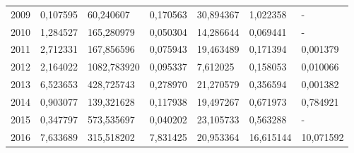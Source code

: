 \begin{table}
\begin{tabular}{p{1cm}p{2cm}p{2cm}p{2cm}p{2cm}p{2cm}p{2cm}}
 2009 &                         0,107595 &                                    60,240607 &                    0,170563 &                       30,894367 &                           1,022358 &                 - \\
 2010 &                         1,284527 &                                   165,280979 &                    0,050304 &                       14,286644 &                           0,069441 &                 - \\
 2011 &                         2,712331 &                                   167,856596 &                    0,075943 &                       19,463489 &                           0,171394 &          0,001379 \\
 2012 &                         2,164022 &                                  1082,783920 &                    0,095337 &                        7,612025 &                           0,158053 &          0,010066 \\
 2013 &                         6,523653 &                                   428,725743 &                    0,278970 &                       21,270579 &                           0,356594 &          0,001382 \\
 2014 &                         0,903077 &                                   139,321628 &                    0,117938 &                       19,497267 &                           0,671973 &          0,784921 \\
 2015 &                         0,347797 &                                   573,535697 &                    0,040202 &                       23,105733 &                           0,563288 &                 - \\
 2016 &                         7,633689 &                                   315,518202 &                    7,831425 &                       20,953364 &                          16,615144 &         10,071592 \\
\bottomrule
\end{tabular}
\end{table}
